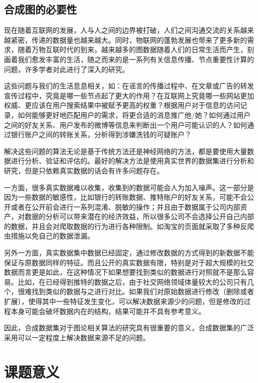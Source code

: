 \subsection{合成图的必要性}

现在随着互联网的发展，人与人之间的边界被打破，人们之间沟通交流的关系越来越紧密，传递的数据量也越来越大。同时，物联网的蓬勃发展也带来了更多新的需求，随着万物互联时代的到来，越来越多的图数据随着人们的日常生活而产生，刻画着我们愈发丰富的生活，随之而来的是一系列有关信息传播、节点重要性计算的问题，许多学者对此进行了深入的研究。

这些问题与我们的生活息息相关，如：在谣言的传播过程中\cite{daley1965stochastic}\cite{maki1973mathematical}、在文章或广告的转发宣传过程中\cite{Danilevsky2013Information}，究竟是哪一些节点起了更大的作用？在互联网上究竟哪一些网站更加权威、更应该在用户搜索结果中被赋予更高的权重\cite{Page98thepagerank}？根据用户对于信息的访问记录，如何能够更好地匹配用户的需求，将更合适的消息推广他/她？如何通过用户之间的好友关系、用户发布的微博等信息来判断出一个用户可能认识的人？如何通过银行账户之间的转账关系，分析得到涉嫌洗钱的可疑账户\cite{pareja2019evolvegcn}？

解决这些问题的算法无论是基于传统方法还是神经网络的方法，都是要使用大量数据进行分析、验证和评估的。最好的解决方法是使用真实世界的数据集进行分析和研究，但是只依赖真实数据的话会有许多问题存在。

一方面，很多真实数据难以收集，收集到的数据可能会人为加入噪声。这一部分是因为一些数据的敏感性，比如银行的转账数据、推特账户的好友关系，可能不会公开或者在公开前会进行一系列混淆、脱敏的操作；并且由于数据属于公司内部资产，对数据的分析可以带来潜在的经济效益，所以很多公司不会选择公开自己内部的数据，并且会对爬取数据的行为进行各种限制。如淘宝的页面就采取了多种反爬虫措施以免自己的数据泄漏。

另外一方面，真实数据集中数据已经固定，通过修改数据的方式得到的新数据不能保证与原数据同样的特征。而且公开的真实数据有限，特别是对于超大规模的社交数据而言更是如此，在这种情况下如果想要找到类似的数据进行对照就不是那么容易。比如，在已经得到推特的数据之后，由于社交网络领域体量较大的公司只有几个，很难找到类似的数据与之进行对比。如果我们对原始数据进行修改（删除或者扩展），使得其中一些特征发生变化，可以解决数据来源少的问题，但是修改的过程本身可能会破坏数据内在的结构，结果可能并不具有参考意义。

因此，合成数据集对于图论相关算法的研究具有很重要的意义，合成数据集的广泛采用可以一定程度上解决数据来源不足的问题。

\section{课题意义}

